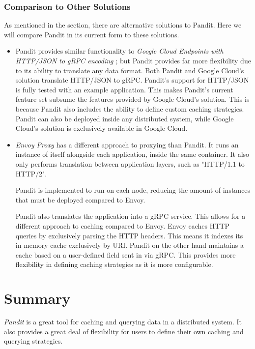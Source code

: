 \documentclass[a4paper,12pt]{report}
\begin{document}
\subsubsection{Comparison to Other Solutions}
\label{sec:comp}
As mentioned in the  section, there are alternative solutions to Pandit.
Here we will compare Pandit in its current form to these solutions.

\begin{itemize}
    \item Pandit provides similar functionality to \textit{Google Cloud Endpoints with HTTP/JSON to gRPC encoding \cite{cloud_endpoints}}; but Pandit provides far more flexibility due to its ability to translate any data format.
    Both Pandit and Google Cloud's solution translate HTTP/JSON to gRPC. Pandit's support for HTTP/JSON is fully tested with an example application.
    This makes Pandit's current feature set subsume the features provided by Google Cloud's solution. 
    This is because Pandit also includes the ability to define custom caching strategies. 
    Pandit can also be deployed inside any distributed system, while Google Cloud's solution is exclusively available in Google Cloud.
    
    \item \textit{Envoy Proxy \cite{envoy}} has a different approach to proxying than Pandit.
    It runs an instance of itself alongside each application, inside the same container.
    It also only performs translation between application layers, such as "HTTP/1.1 to HTTP/2".
    
    Pandit is implemented to run on each node, reducing the amount of instances that must be deployed compared to Envoy.
    
    Pandit also translates the application into a gRPC service. This allows for a different approach to caching compared to Envoy.
    Envoy caches HTTP queries by exclusively parsing the HTTP headers. This means it indexes its in-memory cache exclusively by URI.
    Pandit on the other hand maintains a cache based on a user-defined field sent in via gRPC.
    This provides more flexibility in defining caching strategies as it is more configurable.
\end{itemize}

\section{Summary}
\textit{Pandit} is a great tool for caching and querying data in a distributed system.
It also provides a great deal of flexibility for users to define their own caching and querying strategies.
\end{document}
